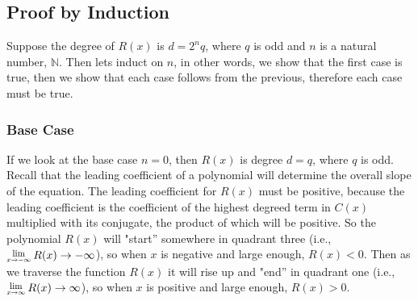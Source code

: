 \documentclass[12pt]{article}
\newcommand{\Lim}[1]{\raisebox{0.5ex}{\scalebox{0.8}{$\displaystyle \lim_{#1}\;$}}}
\begin{document}
\subsection*{Proof by Induction}
Suppose the degree of $R(x)$ is $d=2^n q$, where $q$ is odd and $n$ is a natural number, $\mathbb{N}$.   
Then lets induct on $n$, in other words, we show that the first case is true, then we show that each case follows from the previous, therefore each case must be true.

\pagebreak
\subsubsection*{Base Case}

\begin{wrapfigure}{r}{8cm}
\end{wrapfigure}

If we look at the base case $n=0$, then $R(x)$ is degree $d=q$, where $q$ is odd. Recall that the leading coefficient of a polynomial will determine the overall slope of the equation.  The leading coefficient for $R(x)$ must be positive, because the leading coefficient is the coefficient of the highest degreed term in $C(x)$ multiplied with its conjugate, the product of which will be positive.  So the polynomial $R(x)$ will "start'' somewhere in quadrant three (i.e., $\Lim{x \rightarrow -\infty} R(x) \rightarrow -\infty$), so when $x$ is negative and large enough, $R(x)<0$.  Then as we traverse the function $R(x)$ it will rise up and "end'' in quadrant one (i.e., $\Lim{x \rightarrow \infty} R(x) \rightarrow \infty$), so when $x$ is positive and large enough, $R(x)>0$.\\
\end{document}
